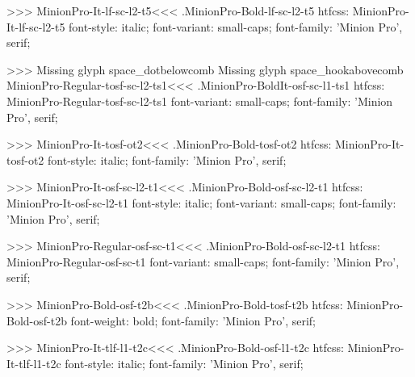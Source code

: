 {>>>
\<MinionPro-It-lf-sc-l2-t5\><<<
.MinionPro-Bold-lf-sc-l2-t5
htfcss:  MinionPro-It-lf-sc-l2-t5  font-style: italic; font-variant: small-caps; font-family: 'Minion Pro', serif;

>>>
Missing glyph	space_dotbelowcomb
Missing glyph	space_hookabovecomb
\<MinionPro-Regular-tosf-sc-l2-ts1\><<<
.MinionPro-BoldIt-osf-sc-l1-ts1
htfcss:  MinionPro-Regular-tosf-sc-l2-ts1  font-variant: small-caps; font-family: 'Minion Pro', serif;

>>>
\<MinionPro-It-tosf-ot2\><<<
.MinionPro-Bold-tosf-ot2
htfcss:  MinionPro-It-tosf-ot2  font-style: italic; font-family: 'Minion Pro', serif;

>>>
\<MinionPro-It-osf-sc-l2-t1\><<<
.MinionPro-Bold-osf-sc-l2-t1
htfcss:  MinionPro-It-osf-sc-l2-t1  font-style: italic; font-variant: small-caps; font-family: 'Minion Pro', serif;

>>>
\<MinionPro-Regular-osf-sc-t1\><<<
.MinionPro-Bold-osf-sc-l2-t1
htfcss:  MinionPro-Regular-osf-sc-t1  font-variant: small-caps; font-family: 'Minion Pro', serif;

>>>
\<MinionPro-Bold-osf-t2b\><<<
.MinionPro-Bold-tosf-t2b
htfcss:  MinionPro-Bold-osf-t2b  font-weight: bold; font-family: 'Minion Pro', serif;

>>>
\<MinionPro-It-tlf-l1-t2c\><<<
.MinionPro-Bold-osf-l1-t2c
htfcss:  MinionPro-It-tlf-l1-t2c  font-style: italic; font-family: 'Minion Pro', serif;

}
